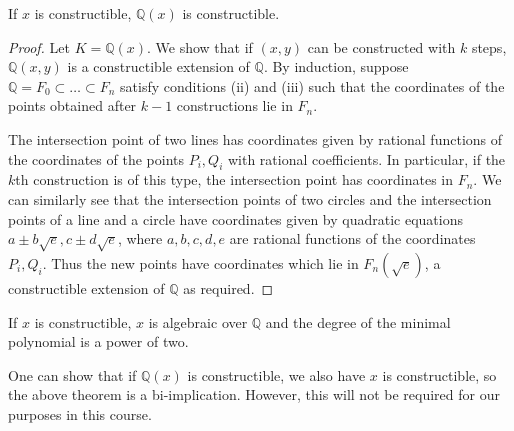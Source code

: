 \begin{theorem}
	If \( x \) is constructible, \( \mathbb Q(x) \) is constructible.
\end{theorem}
\begin{proof}
	Let \( K = \mathbb Q(x) \).
	We show that if \( (x,y) \) can be constructed with \( k \) steps, \( \mathbb Q(x,y) \) is a constructible extension of \( \mathbb Q \).
	By induction, suppose \( \mathbb Q = F_0 \subset \dots \subset F_n \) satisfy conditions (ii) and (iii) such that the coordinates of the points obtained after \( k-1 \) constructions lie in \( F_n \).

	The intersection point of two lines has coordinates given by rational functions of the coordinates of the points \( P_i, Q_i \) with rational coefficients.
	In particular, if the \( k \)th construction is of this type, the intersection point has coordinates in \( F_n \).
	We can similarly see that the intersection points of two circles and the intersection points of a line and a circle have coordinates given by quadratic equations \( a \pm b \sqrt e, c \pm d \sqrt e \), where \( a, b, c, d, e \) are rational functions of the coordinates \( P_i, Q_i \).
	Thus the new points have coordinates which lie in \( F_n(\sqrt e) \), a constructible extension of \( \mathbb Q \) as required.
\end{proof}
\begin{corollary}
	If \( x \) is constructible, \( x \) is algebraic over \( \mathbb Q \) and the degree of the minimal polynomial is a power of two.
\end{corollary}
\begin{remark}
	One can show that if \( \mathbb Q(x) \) is constructible, we also have \( x \) is constructible, so the above theorem is a bi-implication.
	However, this will not be required for our purposes in this course.
\end{remark}

